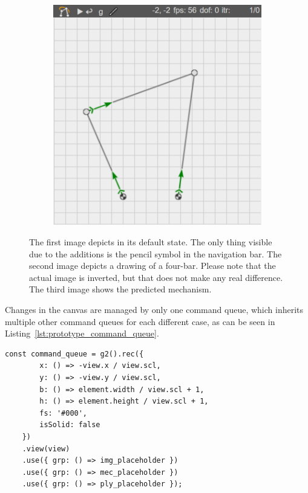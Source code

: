 \begin{figure}
\begin{subfigure}[b]{0.32\textwidth}
        \caption{}\label{fig:prototype_drawing}
    \end{subfigure}
    \begin{subfigure}[b]{0.32\textwidth}
        \includegraphics[width=\textwidth]{images/prototype_after.png}
        \caption{}\label{fig:prototype_after}
    \end{subfigure}
    \caption[deepmech prototype.]{The first image depicts  in its default state. The only thing visible due to the additions is the pencil symbol in the navigation bar.
    The second image depicts a drawing of a four-bar. Please note that the actual image is inverted, but that does not make any real difference.
    The third image shows the predicted mechanism.}\label{fig:prototype}
\end{figure}

Changes in the canvas are managed by only one  command queue, which inherits multiple other command queues for each different case, as can be seen in Listing~\ref{lst:prototype_command_queue}.

\begin{lstlisting}[caption={Command queue for the drawing context in the prototype.}, label={lst:prototype_command_queue}]
const command_queue = g2().rec({
        x: () => -view.x / view.scl,
        y: () => -view.y / view.scl,
        b: () => element.width / view.scl + 1,
        h: () => element.height / view.scl + 1,
        fs: '#000',
        isSolid: false
    })
    .view(view)
    .use({ grp: () => img_placeholder })
    .use({ grp: () => mec_placeholder })
    .use({ grp: () => ply_placeholder });
\end{lstlisting}

